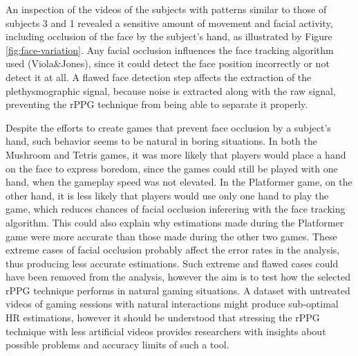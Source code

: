 An inspection of the videos of the subjects with patterns similar to those of subjects 3 and 1 revealed a sensitive amount of movement and facial activity, including occlusion of the face by the subject's hand, as illustrated by Figure \ref{fig:face-variation}. Any facial occlusion influences the face tracking algorithm used (Viola\&Jones), since it could detect the face position incorrectly or not detect it at all. A flawed face detection step affects the extraction of the plethysmographic signal, because noise is extracted along with the raw signal, preventing the rPPG technique from being able to separate it properly.

Despite the efforts to create games that prevent face occlusion by a subject's hand, such behavior seems to be natural in boring situations. In both the Mushroom and Tetris games, it was more likely that players would place a hand on the face to express boredom, since the games could still be played with one hand, when the gameplay speed was not elevated. In the Platformer game, on the other hand, it is less likely that players would use only one hand to play the game, which reduces chances of facial occlusion inferering with the face tracking algorithm. This could also explain why estimations made during the Platformer game were more accurate than those made during the other two games. These extreme cases of facial occlusion probably affect the error rates in the analysis, thus producing less accurate estimations. Such extreme and flawed cases could have been removed from the analysis, however the aim is to test how the selected rPPG technique performs in natural gaming situations. A dataset with untreated videos of gaming sessions with natural interactions might produce sub-optimal HR estimations, however it should be understood that stressing the rPPG technique with less artificial videos provides researchers with insights about possible problems and accuracy limits of such a tool.

